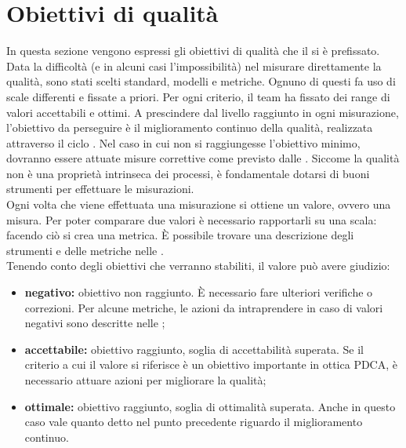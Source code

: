 \newpage



\section{Obiettivi di qualità}
	In questa sezione vengono espressi gli obiettivi di qualità che il  si è prefissato. Data la difficoltà (e in alcuni casi l'impossibilità) nel misurare direttamente la qualità, sono stati scelti standard, modelli e metriche.
	Ognuno di questi fa uso di scale differenti e fissate a priori. Per ogni criterio, il team ha fissato dei range di valori accettabili e ottimi. A prescindere dal livello raggiunto in ogni misurazione, l'obiettivo da perseguire è il miglioramento continuo della qualità, realizzata attraverso il ciclo . Nel caso in cui non si raggiungesse l'obiettivo minimo, dovranno essere attuate misure correttive come previsto dalle \ndpv.	
	Siccome la qualità non è una proprietà intrinseca dei processi, è fondamentale dotarsi di buoni strumenti per effettuare le misurazioni.\\
	Ogni volta che viene effettuata una misurazione si ottiene un valore, ovvero una misura. Per poter comparare due valori è necessario rapportarli su una scala: facendo ciò si crea una metrica.
	È possibile trovare una descrizione degli strumenti e delle metriche nelle \ndpv. \\
	Tenendo conto degli obiettivi che verranno stabiliti, il valore può avere giudizio:
	\begin{itemize}
		\item \textbf{negativo:} obiettivo non raggiunto. È necessario fare ulteriori verifiche o correzioni. Per alcune metriche, le azioni da intraprendere in caso di valori negativi sono descritte nelle \ndpv;
		\item \textbf{accettabile:} obiettivo raggiunto, soglia di accettabilità superata.
		Se il criterio a cui il valore si riferisce è un obiettivo importante in ottica PDCA, è necessario attuare azioni per migliorare la qualità;
		\item \textbf{ottimale:} obiettivo raggiunto, soglia di ottimalità superata. Anche in questo caso vale quanto detto nel punto precedente riguardo il miglioramento continuo.
	\end{itemize}

